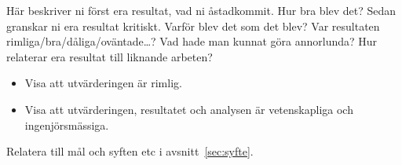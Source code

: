 Här beskriver ni först era resultat, vad ni åstadkommit.  Hur bra blev det?
Sedan granskar ni era resultat kritiskt.  Varför blev det som det blev?  Var resultaten rimliga/bra/dåliga/o\-vän\-ta\-de\ldots?  
Vad hade man kunnat göra annorlunda?  Hur relaterar era resultat till liknande arbeten?  

\begin{itemize}
\item Visa att utvärderingen är rimlig.
\item Visa att utvärderingen, resultatet och analysen är vetenskapliga och in\-gen\-jörs\-mässiga.
\end{itemize}

Relatera till mål och syften etc i avsnitt~\ref{sec:syfte}.


